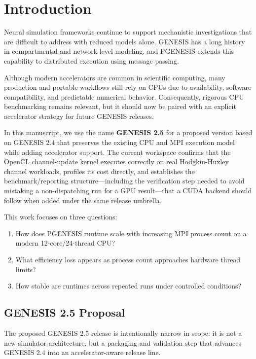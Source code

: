 \documentclass[11pt,a4paper]{article}
\begin{document}
\section{Introduction}

Neural simulation frameworks continue to support mechanistic investigations that are difficult to address with reduced models alone. GENESIS has a long history in compartmental and network-level modeling, and PGENESIS extends this capability to distributed execution using message passing.

Although modern accelerators are common in scientific computing, many production and portable workflows still rely on CPUs due to availability, software compatibility, and predictable numerical behavior. Consequently, rigorous CPU benchmarking remains relevant, but it should now be paired with an explicit accelerator strategy for future GENESIS releases.

In this manuscript, we use the name \textbf{GENESIS 2.5} for a proposed version based on GENESIS 2.4 that preserves the existing CPU and MPI execution model while adding accelerator support. The current workspace confirms that the OpenCL channel-update kernel executes correctly on real Hodgkin-Huxley channel workloads, profiles its cost directly, and establishes the benchmark/reporting structure---including the verification step needed to avoid mistaking a non-dispatching run for a GPU result---that a CUDA backend should follow when added under the same release umbrella.

This work focuses on three questions:
\begin{enumerate}[nosep]
  \item How does PGENESIS runtime scale with increasing MPI process count on a modern 12-core/24-thread CPU?
  \item What efficiency loss appears as process count approaches hardware thread limits?
  \item How stable are runtimes across repeated runs under controlled conditions?
\end{enumerate}

\subsection{GENESIS 2.5 Proposal}

The proposed GENESIS 2.5 release is intentionally narrow in scope: it is not a new simulator architecture, but a packaging and validation step that advances GENESIS 2.4 into an accelerator-aware release line.
\end{document}
